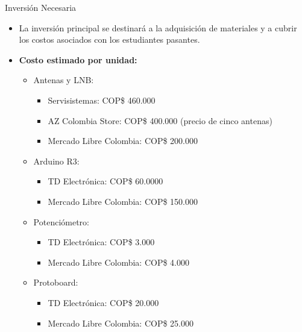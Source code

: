 \begin{frame}{Inversión Necesaria}
  \begin{itemize}
    \item La inversión principal se destinará a la adquisición de
      materiales y a cubrir los costos asociados con los estudiantes
      pasantes.
    \item \textbf{Costo estimado por unidad:}
      \begin{itemize}
        \item Antenas y LNB:
          \begin{itemize}
            \item Servisistemas: COP\$ 460.000
            \item AZ Colombia Store: COP\$ 400.000 (precio de cinco antenas)
            \item Mercado Libre Colombia: COP\$ 200.000
          \end{itemize}
        \item Arduino R3:
          \begin{itemize}
            \item TD Electrónica: COP\$ 60.0000
            \item Mercado Libre Colombia: COP\$ 150.000
          \end{itemize}
        \item Potenciómetro:
          \begin{itemize}
            \item TD Electrónica: COP\$ 3.000
            \item Mercado Libre Colombia: COP\$ 4.000
          \end{itemize}
        \item Protoboard:
          \begin{itemize}
            \item TD Electrónica: COP\$ 20.000
            \item Mercado Libre Colombia: COP\$ 25.000
          \end{itemize}
      \end{itemize}
  \end{itemize}
\end{frame}

